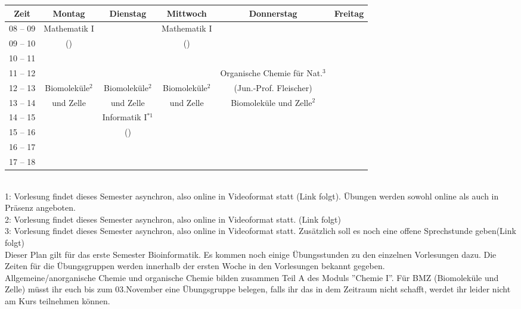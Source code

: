 \begin{minipage}{\textwidth}
    \footnotesize
\begin{tabular}{|c|c|c|c|c|c|} \hline
Zeit      & 		Montag 		& Dienstag			& Mittwoch 			& Donnerstag 			& Freitag\\\hline\hline
08 -- 09  & 		Mathematik I 	&  				& Mathematik I 		        &  				&\\\cline{1-1}\cline{3-3}\cline{5-6}
09 -- 10  & 		(\Matheprof)    &   				 & (\Matheprof)                 &  				&\\\hline
10 -- 11  &				&				&				&				&\\\hline
11 -- 12 & 				&  				&				& Organische Chemie für Nat.$^3$ 		&\\\cline{1-4} \cline{6-6}
12 -- 13 & 		Biomoleküle$^2$	&  Biomoleküle$^2$              & Biomoleküle$^2$    & 		(Jun.-Prof. Fleischer)	& \\\cline{1-1}\cline{3-3}\cline{5-6}
13 -- 14 & 		und Zelle       & und Zelle 	                & und Zelle           & 	Biomoleküle und Zelle$^2$				&  \\\hline
14 -- 15 & 				& Informatik I$^{*1}$ &                				&  				& \\\cline{1-2}\cline{4-6}
15 -- 16 &			                & (\Infoprof) 	    & 					& 				&\\\cline{1-3} \cline{5-6}
16 -- 17 & & & & &\\\hline
17 -- 18 & & & & & \\\hline
\end{tabular}
\end{minipage}
\\
1: Vorlesung findet dieses Semester asynchron, also online in Videoformat statt (Link folgt). Übungen werden sowohl online als auch in Präsenz angeboten.\\
2: Vorlesung findet dieses Semester asynchron, also online in Videoformat statt. (Link folgt)\\
3: Vorlesung findet dieses Semester asynchron, also online in Videoformat statt. Zusätzlich soll es noch eine offene Sprechstunde geben(Link folgt)
\\
Dieser Plan gilt für das erste Semester Bioinformatik. Es kommen noch einige Übungsstunden
zu den einzelnen Vorlesungen dazu. Die Zeiten für die Übungsgruppen werden innerhalb der ersten Woche in den Vorlesungen bekannt gegeben.\\
Allgemeine/anorganische Chemie und organische Chemie bilden zusammen Teil A des Moduls ''Chemie I''.
Für BMZ (Biomoleküle und Zelle) müsst ihr euch bis zum 03.November eine Übungsgruppe belegen, falls ihr das in dem Zeitraum nicht schafft, werdet ihr leider nicht am Kurs teilnehmen können.


